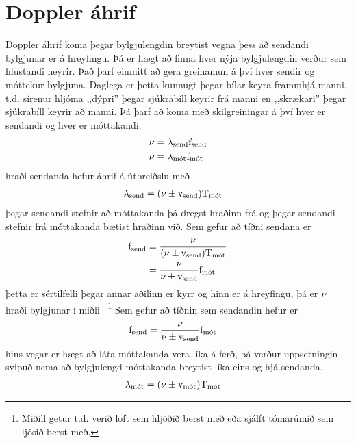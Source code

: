 \section{Doppler áhrif}
Doppler áhrif koma þegar bylgjulengdin breytist vegna þess að sendandi bylgjunar
er á hreyfingu. Þá er hægt að finna hver nýja bylgjulengdin verður sem hlustandi
heyrir. Það þarf einmitt að gera greinamun á því hver sendir og móttekur
bylgjuna. Daglega er þetta kunnugt þegar bílar keyra frammhjá manni, t.d.
sírenur hljóma ,,dýpri'' þegar sjúkrabíll keyrir frá manni en ,,skrækari''
þegar sjúkrabíll keyrir að manni. Þá þarf að koma með skilgreiningar 
á því hver er sendandi og hver er móttakandi.
\begin{align*}
	\nu &= \lambda_{\text{send}} \text{f}_{\text{send}} \\ 
	\nu &= \lambda_{\text{mót}} \text{f}_{\text{mót}}
\end{align*}
hraði sendanda hefur áhrif á útbreiðslu með
\begin{align*}
	\lambda_{\text{send}} &= 
		(\nu \pm \textrm{v}_{\text{send}} ) \text{T}_{\text{mót}}
\end{align*}
þegar sendandi stefnir að móttakanda þá dregst hraðinn frá og þegar sendandi
stefnir frá móttakanda bætist hraðinn við. Sem gefur að tíðni sendana er
\begin{align*}
	\text{f}_\text{send} &= \frac{ \nu }{
		 (\nu \pm \textrm{v}_\text{send} ) \text{T}_\text{mót} } \\
	&= \frac{ \nu} {
		 \nu \pm \textrm{v}_\text{send} } \text{f}_\text{mót}
\end{align*}
þetta er sértilfelli þegar annar aðilinn er kyrr og hinn er á hreyfingu, þá
er $\nu$ hraði bylgjunar í miðli%
~\footnote{Miðill getur t.d. verið loft sem hljóðið berst með eða sjálft
tómarúmið sem ljósið berst með.}
Sem gefur að tíðnin sem sendandin hefur er
\begin{align}
	\text{f}_\text{send} &= \frac{ \nu } {
		 \nu \pm \textrm{v}_\text{send} } \text{f}_\text{mót}
\end{align}
hins vegar er hægt að láta móttakanda vera líka á ferð, þá verður uppsetningin svipuð
nema að bylgjulengd móttakanda breytist líka eins og hjá sendanda.
\begin{align*}
	\lambda_{\text{mót}} &= 
		(\nu \pm \textrm{v}_\text{mót} ) \text{T}_{\text{mót}}
\end{align*}
